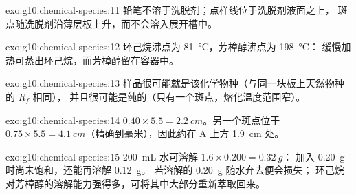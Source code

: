 \begin{solution}{exo:g10:chemical-species:11}
铅笔不溶于洗脱剂；点样线位于洗脱剂液面之上，
斑点随洗脱剂沿薄层板上升，而不会溶入展开槽中。
\end{solution}

\begin{solution}{exo:g10:chemical-species:12}
环己烷沸点为 \qty{81}{\celsius}，芳樟醇沸点为 \qty{198}{\celsius}：
缓慢加热可蒸出环己烷，而芳樟醇留在容器中。
\end{solution}

\begin{solution}{exo:g10:chemical-species:13}
样品很可能就是该化学物种（与同一块板上天然物种的 $R_f$ 相同），
并且很可能是纯的（只有一个斑点，熔化温度范围窄）。
\end{solution}

\begin{solution}{exo:g10:chemical-species:14}
$0.40 \times 5.5 = \qty{2.2}{cm}$。另一个斑点位于 $0.75 \times 5.5 =
\qty{4.1}{cm}$（精确到毫米），因此约在 A 上方 \qty{1.9}{cm} 处。
\end{solution}

\begin{solution}{exo:g10:chemical-species:15}
\qty{200}{mL} 水可溶解 $1.6 \times 0.200 = \qty{0.32}{g}$：
加入 \qty{0.20}{g} 时尚未饱和，还能再溶解 \qty{0.12}{g}。
若溶解的 \qty{0.20}{g} 随水弃去便会损失；
环己烷对芳樟醇的溶解能力强得多，可将其中大部分重新萃取回来。
\end{solution}

